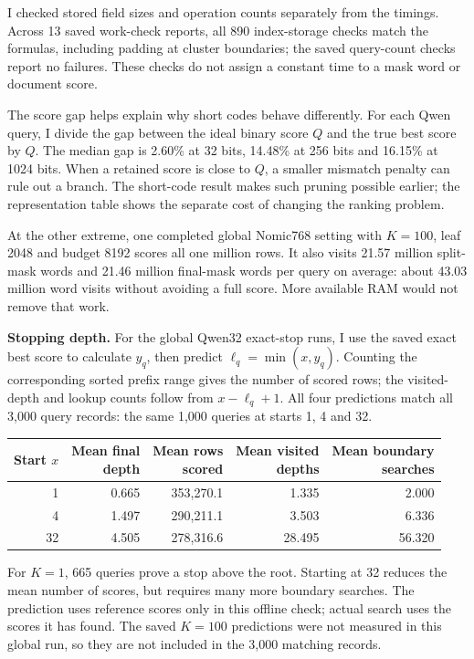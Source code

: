 I checked stored field sizes and operation counts separately from the timings. Across 13 saved work-check reports, all 890 index-storage checks match the formulas, including padding at cluster boundaries; the saved query-count checks report no failures. These checks do not assign a constant time to a mask word or document score.

The score gap helps explain why short codes behave differently. For each Qwen query, I divide the gap between the ideal binary score $Q$ and the true best score by $Q$. The median gap is 2.60\% at 32 bits, 14.48\% at 256 bits and 16.15\% at 1024 bits. When a retained score is close to $Q$, a smaller mismatch penalty can rule out a branch. The short-code result makes such pruning possible earlier; the representation table shows the separate cost of changing the ranking problem.

At the other extreme, one completed global Nomic768 setting with $K=100$, leaf 2048 and budget 8192 scores all one million rows. It also visits 21.57 million split-mask words and 21.46 million final-mask words per query on average: about 43.03 million word visits without avoiding a full score. More available RAM would not remove that work.

\textbf{Stopping depth.}
For the global Qwen32 exact-stop runs, I use the saved exact best score to calculate $y_q$, then predict $\ell_q=\min(x,y_q)$. Counting the corresponding sorted prefix range gives the number of scored rows; the visited-depth and lookup counts follow from $x-\ell_q+1$. All four predictions match all 3,000 query records: the same 1,000 queries at starts 1, 4 and 32.

\begin{center}\small
\begin{tabular}{@{}rrrrr@{}}\toprule
Start $x$ & \shortstack{Mean final\\depth} & \shortstack{Mean rows\\scored} & \shortstack{Mean visited\\depths} & \shortstack{Mean boundary\\searches}\\\midrule
1 & 0.665 & 353,270.1 & 1.335 & 2.000\\
4 & 1.497 & 290,211.1 & 3.503 & 6.336\\
32 & 4.505 & 278,316.6 & 28.495 & 56.320\\\bottomrule
\end{tabular}
\end{center}
For $K=1$, 665 queries prove a stop above the root. Starting at 32 reduces the mean number of scores, but requires many more boundary searches. The prediction uses reference scores only in this offline check; actual search uses the scores it has found. The saved $K=100$ predictions were not measured in this global run, so they are not included in the 3,000 matching records.


